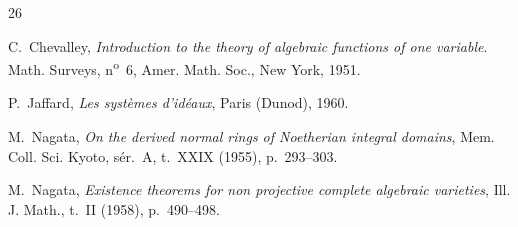 \clearpage
{}
{}
\renewcommand{\bibname}{Bibliographie \textit{(suite)}}

\begin{thebibliography}{26}

C.~Chevalley,
\emph{Introduction to the theory of algebraic functions of one variable}.
Math. Surveys, n\textsuperscript{o}~6, Amer. Math. Soc., New York, 1951.

P.~Jaffard,
\emph{Les systèmes d'idéaux}, Paris (Dunod), 1960.

M.~Nagata,
\emph{On the derived normal rings of Noetherian integral domains},
Mem. Coll. Sci. Kyoto, sér.~A, t.~XXIX (1955), p.~293--303.

M.~Nagata,
\emph{Existence theorems for non projective complete algebraic varieties},
Ill. J. Math., t.~II (1958), p.~490--498.

\end{thebibliography}
